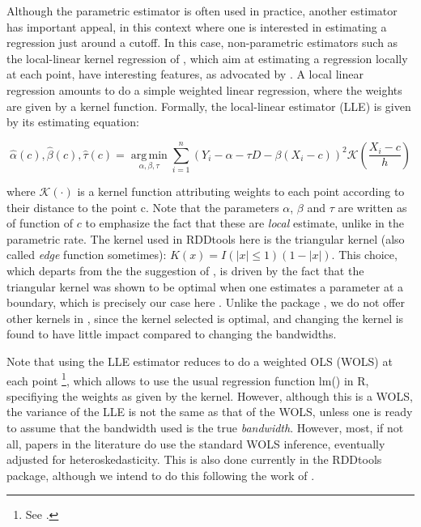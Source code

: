 \documentclass[english,nojss]{jss}\usepackage{graphicx, color}
\DeclareMathOperator*{\argmi}{arg\,min}
\newcommand{\argmin}[1]{\underset{#1}{\argmi}}
\begin{document}
Although the parametric estimator is often used in practice, another
estimator has important appeal, in this context where one is interested
in estimating a regression just around a cutoff. In this case, non-parametric
estimators such as the local-linear kernel regression of \citet{FanGijbels1992,FanGijbels1996},
which aim at estimating a regression locally at each point, have interesting
features, as advocated by \citet{Porter2003}. A local linear regression
amounts to do a simple weighted linear regression, where the weights
are given by a kernel function. Formally, the local-linear estimator
(LLE) is given by its estimating equation:



\begin{equation}
\hat{\alpha}(c),\hat{\beta}(c),\hat{\tau}(c)=\argmin{\alpha,\beta,\tau}\sum_{i=1}^{n}\left(Y_{i}-\alpha-\tau D-\beta(X_{i}-c)\right)^{2}\mathcal{K}\left(\frac{X_{i}-c}{h}\right)\label{eq:LLEform}
\end{equation}


where $\mathcal{K}(\cdot)$ is a kernel function attributing weights
to each point according to their distance to the point c. Note that
the parameters $\alpha$, $\beta$ and $\tau$ are written as of function
of $c$ to emphasize the fact that these are \emph{local} estimate,
unlike in the parametric rate. The kernel used in RDDtools here is
the triangular kernel (also called \emph{edge} function sometimes):
$K(x)=I(|x|\leq1)(1-|x|)$. This choice, which departs from the the
suggestion of \citet{LeeLemieux2010}, is driven by the fact that
the triangular kernel was shown to be optimal when one estimates a
parameter at a boundary, which is precisely our case here \citep{ChengFanEtAl1997}.
Unlike the package , we do not offer other kernels in ,
since the kernel selected is optimal, and changing the kernel is found
to have little impact compared to changing the bandwidths.

Note that using the LLE estimator reduces to do a weighted OLS (WOLS)
at each point%
\footnote{See \citep[equ. 3.4, page  58]{FanGijbels1996}. %
}, which allows to use the usual regression function lm() in R, specifiying
the weights as given by the kernel. However, although this is a WOLS,
the variance of the LLE is not the same as that of the WOLS, unless
one is ready to assume that the bandwidth used is the true \emph{bandwidth}.
However, most, if not all, papers in the literature do use the standard
WOLS inference, eventually adjusted for heteroskedasticity. This is
also done currently in the RDDtools package, although we intend to
do this following the work of \citet{CalonicoCattaneoEtAl2012}. 
\end{document}
